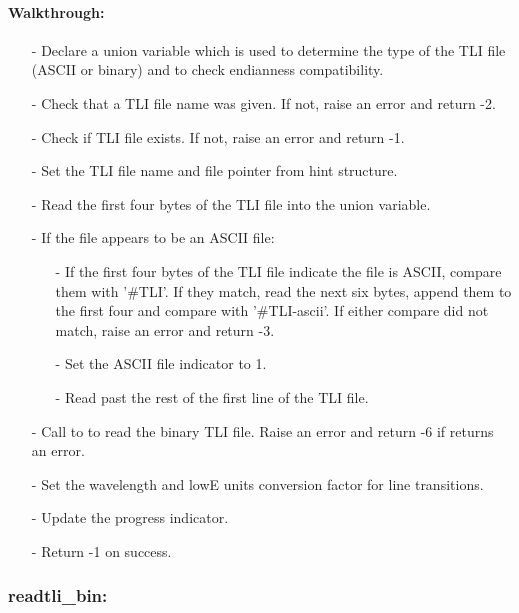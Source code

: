 \documentclass[letterpaper,12pt]{article}
\begin{document}
\paragraph{Walkthrough:}
\begin{enumerate}[leftmargin=10pt, noitemsep, parsep=0pt, topsep=0ex]
\item[-] Declare a union variable which is used to determine the type of the TLI file (ASCII or binary) and to check endianness compatibility.
\item[-] Check that a TLI file name was given. If not, raise an error and return -2.
\item[-] Check if TLI file exists. If not, raise an error and return -1.
\item[-] Set the TLI file name and file pointer from hint structure.
\item[-] Read the first four bytes of the TLI file into the union variable.
\item[-] If the file appears to be an ASCII file:
\begin{enumerate}[leftmargin=10pt, noitemsep, parsep=0pt, topsep=0ex]
\item[-] If the first four bytes of the TLI file indicate the file is ASCII, compare them with '#TLI'. If they match, read the next six bytes, append them to the first four and compare with '#TLI-ascii'. If either compare did not match, raise an error and return -3. 
\item[-] Set the ASCII file indicator to 1.
\item[-] Read past the rest of the first line of the TLI file.
\end{enumerate}
\item[-] Call to  to read the binary TLI file. Raise an error and return -6 if  returns an error.
\item[-] Set the wavelength and lowE units conversion factor for line transitions.
\item[-] Update the progress indicator.
\item[-] Return -1 on success.
\end{enumerate}

\subsubsection{readtli\_bin:}
\end{document}
